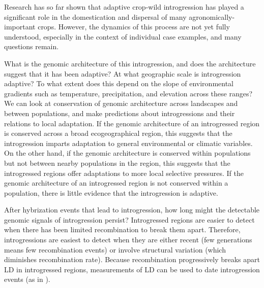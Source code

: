 \documentclass[11pt]{article}
\newcommand{\gmj}[1]{\textcolor{blue}{ \emph{\scriptsize  #1}} } %
\begin{document}
Research has so far shown that adaptive crop-wild introgression has played a significant role in the domestication and dispersal of many agronomically-important crops.
However, the dynamics of this process are not yet fully understood, especially in the context of individual case examples, and many questions remain.


What is the genomic architecture of this introgression, and does the architecture suggest that it has been adaptive?
At what geographic scale is introgression adaptive?
To what extent does this depend on the slope of environmental gradients such as temperature, precipitation, and elevation across these ranges?
We can look at conservation of genomic architecture across landscapes and between populations, and make predictions about introgressions and their relations to local adaptation.
If the genomic architecture of an introgressed region is conserved across a broad ecogeographical region, this suggests that the introgression imparts adaptation to general environmental or climatic variables.
On the other hand, if the genomic architecture is conserved within populations but not between nearby populations in the region, this suggests that the introgressed regions offer adaptations to more local selective pressures.
If the genomic architecture of an introgressed region is not conserved within a population, there is little evidence that the introgression is adaptive.


After hybrization events that lead to introgression, how long might the detectable genomic signals of introgression persist?
Introgressed regions are easier to detect when there has been limited recombination to break them apart.
Therefore, introgressions are easiest to detect when they are either recent (few generations means few recombination events) or involve structural variation (which diminishes recombination rate).
Because recombination progressively breaks apart LD in introgressed regions, measurements of LD can be used to date introgression events (as in \cite{Poets2015}).
\end{document}
